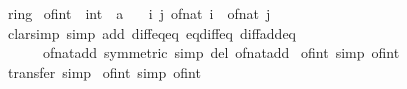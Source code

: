 \begin{isabellebody}
%
\isatagdocument
%
\isamarkuptrue%
%
\endisatagdocument
{\isafolddocument}%
%
\isadelimdocument
%
\endisadelimdocument
{}\isamarkupfalse%
\ ring{\isacharunderscore}{\kern0pt}{}\isanewline
{}\isanewline
\isanewline
{}\isamarkupfalse%
\ of{\isacharunderscore}{\kern0pt}int\ {\isacharcolon}{\kern0pt}{\isacharcolon}{\kern0pt}\ {\isachardoublequoteopen}int\ {\isasymRightarrow}\ {\isacharprime}{\kern0pt}a{\isachardoublequoteclose}\isanewline
\ \ \ {\isachardoublequoteopen}{\isasymlambda}{\isacharparenleft}{\kern0pt}i{\isacharcomma}{\kern0pt}\ j{\isacharparenright}{\kern0pt}{\isachardot}{\kern0pt}\ of{\isacharunderscore}{\kern0pt}nat\ i\ {\isacharminus}{\kern0pt}\ of{\isacharunderscore}{\kern0pt}nat\ j{\isachardoublequoteclose}\isanewline
%
\isadelimproof
\ \ %
\endisadelimproof
%
\isatagproof
{}\isamarkupfalse%
\ {\isacharparenleft}{\kern0pt}clarsimp\ simp\ add{\isacharcolon}{\kern0pt}\ diff{\isacharunderscore}{\kern0pt}eq{\isacharunderscore}{\kern0pt}eq\ eq{\isacharunderscore}{\kern0pt}diff{\isacharunderscore}{\kern0pt}eq\ diff{\isacharunderscore}{\kern0pt}add{\isacharunderscore}{\kern0pt}eq\isanewline
\ \ \ \ \ \ of{\isacharunderscore}{\kern0pt}nat{\isacharunderscore}{\kern0pt}add\ {\isacharbrackleft}{\kern0pt}symmetric{\isacharbrackright}{\kern0pt}\ simp\ del{\isacharcolon}{\kern0pt}\ of{\isacharunderscore}{\kern0pt}nat{\isacharunderscore}{\kern0pt}add{\isacharparenright}{\kern0pt}%
\endisatagproof
{\isafoldproof}%
%
\isadelimproof
\isanewline
%
\endisadelimproof
\isanewline
{}\isamarkupfalse%
\ of{\isacharunderscore}{\kern0pt}int{\isacharunderscore}{\kern0pt}{}\ {\isacharbrackleft}{\kern0pt}simp{\isacharbrackright}{\kern0pt}{\isacharcolon}{\kern0pt}\ {\isachardoublequoteopen}of{\isacharunderscore}{\kern0pt}int\ {}\ {\isacharequal}{\kern0pt}\ {}{\isachardoublequoteclose}\isanewline
%
\isadelimproof
\ \ %
\endisadelimproof
%
\isatagproof
{}\isamarkupfalse%
\ transfer\ simp%
\endisatagproof
{\isafoldproof}%
%
\isadelimproof
\isanewline
%
\endisadelimproof
\isanewline
{}\isamarkupfalse%
\ of{\isacharunderscore}{\kern0pt}int{\isacharunderscore}{\kern0pt}{}\ {\isacharbrackleft}{\kern0pt}simp{\isacharbrackright}{\kern0pt}{\isacharcolon}{\kern0pt}\ {\isachardoublequoteopen}of{\isacharunderscore}{\kern0pt}int\ {}\ {\isacharequal}{\kern0pt}\ {}{\isachardoublequoteclose}\isanewline

\end{isabellebody}

